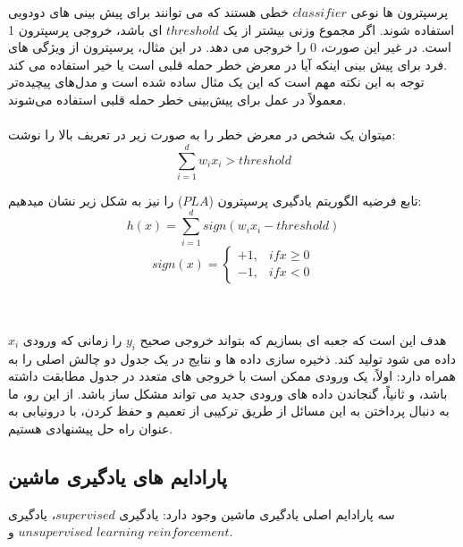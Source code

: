 \documentclass[12pt]{article}
\begin{document}
پرسپترون ها نوعی $classifier$ خطی هستند که می توانند برای پیش بینی های دودویی استفاده شوند. اگر مجموع وزنی بیشتر از یک $threshold$ ای باشد، خروجی پرسپترون 1 است. در غیر این صورت، 0 را خروجی می دهد. در این مثال، پرسپترون از ویژگی های فرد برای پیش بینی اینکه آیا در معرض خطر حمله قلبی است یا خیر استفاده می کند.
\\
توجه به این نکته مهم است که این یک مثال ساده شده است و مدل‌های پیچیده‌تر معمولاً در عمل برای پیش‌بینی خطر حمله قلبی استفاده می‌شوند.
\\
\\
میتوان یک شخص در معرض خطر را به صورت زیر در تعریف بالا را نوشت:
\[
\sum_{i=1}^{d}w_{i}x_{i}>threshold
\]

تابع فرضیه الگوریتم یادگیری پرسپترون ($PLA$) را نیز به شکل زیر نشان میدهیم:
\[
h(x) = \sum_{i=1}^d sign(w_i x_i - threshold)
\]
\[
sign(x) = \begin{cases}
+1, & if  x \geq 0 \\
-1, & if  x < 0
\end{cases}
\]

\\
\\
هدف این است که جعبه ای بسازیم که بتواند خروجی صحیح $y_i$ را زمانی که ورودی $x_i$ داده می شود تولید کند. ذخیره سازی داده ها و نتایج در یک جدول دو چالش اصلی را به همراه دارد: اولاً، یک ورودی ممکن است با خروجی های متعدد در جدول مطابقت داشته باشد، و ثانیاً، گنجاندن داده های ورودی جدید می تواند مشکل ساز باشد. از این رو، ما به دنبال پرداختن به این مسائل از طریق ترکیبی از تعمیم و حفظ کردن، با درونیابی به عنوان راه حل پیشنهادی هستیم.


\subsection*{پارادایم های یادگیری ماشین}
سه پارادایم اصلی یادگیری ماشین وجود دارد: یادگیری $supervised$، یادگیری $unsupervised$ و $learning$ $reinforcement$.
\end{document}
